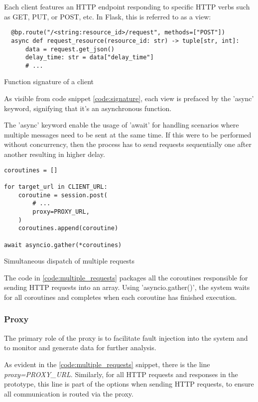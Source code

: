 Each client features an HTTP endpoint responding to specific HTTP verbs such as
GET, PUT, or POST, etc. In Flask, this is referred to as a view:

\begin{listing}[!ht]
  \begin{verbatim}
  @bp.route("/<string:resource_id>/request", methods=["POST"])
  async def request_resource(resource_id: str) -> tuple[str, int]:
      data = request.get_json()
      delay_time: str = data["delay_time"]
      # ...
  \end{verbatim}
\caption{Function signature of a client}
\label{code:signature}
\end{listing}

As visible from code snippet \ref{code:signature}, each view is prefaced by the 'async' keyword, signifying that it's an asynchronous function. 

The 'async' keyword  enable the usage of 'await' for handling
scenarios where multiple messages need to be sent at the same time. 
If this were to be performed without concurrency, then the process has to send 
requests sequentially one after another resulting in higher delay.


\begin{listing}[!ht]
\begin{verbatim}
coroutines = []

for target_url in CLIENT_URL:
    coroutine = session.post(
        # ...
        proxy=PROXY_URL,
    )
    coroutines.append(coroutine)

await asyncio.gather(*coroutines)
\end{verbatim}
\caption{Simultaneous dispatch of multiple requests}
\label{code:multiple_requests}
\end{listing}

The code in \ref{code:multiple_requests} packages all the coroutines responsible for sending HTTP requests into an array. Using 'asyncio.gather()', the system waits for all coroutines and completes when each coroutine has finished execution.

\subsubsection{Proxy}

The primary role of the proxy is to facilitate fault injection into the system and to monitor and generate data for further analysis.

As evident in the \ref{code:multiple_requests} snippet, there is the line \textit{proxy=PROXY\_URL}. Similarly, for all HTTP requests and responses in the prototype, this line is part of the options when sending HTTP requests, to ensure all communication is routed via the proxy.

